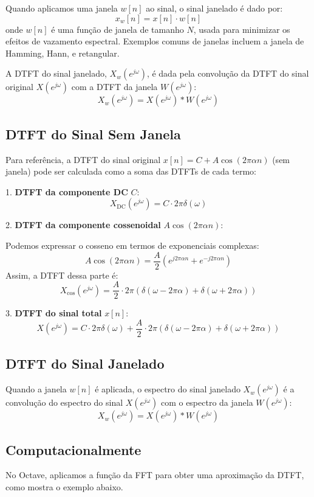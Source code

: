 Quando aplicamos uma janela $w[n]$ ao sinal, o sinal janelado é dado por:
$$
   x_w[n] = x[n] \cdot w[n]
$$
onde $w[n]$ é uma função de janela de tamanho $N$, usada para minimizar os efeitos de vazamento espectral. Exemplos comuns de janelas incluem a janela de Hamming, Hann, e retangular.

A DTFT do sinal janelado, $X_w(e^{j \omega})$, é dada pela convolução da DTFT do sinal original $X(e^{j \omega})$ com a DTFT da janela $W(e^{j \omega})$:
$$
   X_w(e^{j \omega}) = X(e^{j \omega}) * W(e^{j \omega})
$$

\subsection*{DTFT do Sinal Sem Janela}

Para referência, a DTFT do sinal original $x[n] = C + A \cos(2 \pi \alpha n)$ (sem janela) pode ser calculada como a soma das DTFTs de cada termo:

1. \textbf{DTFT da componente DC} $C$:
$$
   X_{\text{DC}}(e^{j \omega}) = C \cdot 2 \pi \delta(\omega)
$$

2. \textbf{DTFT da componente cossenoidal} $A \cos(2 \pi \alpha n)$:

Podemos expressar o cosseno em termos de exponenciais complexas:
$$
   A \cos(2 \pi \alpha n) = \frac{A}{2} \left( e^{j 2 \pi \alpha n} + e^{-j 2 \pi \alpha n} \right)
$$
Assim, a DTFT dessa parte é:
$$
   X_{\cos}(e^{j \omega}) = \frac{A}{2} \cdot 2 \pi \left( \delta(\omega - 2 \pi \alpha) + \delta(\omega + 2 \pi \alpha) \right)
$$

3. \textbf{DTFT do sinal total} $x[n]$:
$$
   X(e^{j \omega}) = C \cdot 2 \pi \delta(\omega) + \frac{A}{2} \cdot 2 \pi \left( \delta(\omega - 2 \pi \alpha) + \delta(\omega + 2 \pi \alpha) \right)
$$

\subsection*{DTFT do Sinal Janelado}

Quando a janela $w[n]$ é aplicada, o espectro do sinal janelado $X_w(e^{j \omega})$ é a convolução do espectro do sinal $X(e^{j \omega})$ com o espectro da janela $W(e^{j \omega})$:
$$
   X_w(e^{j \omega}) = X(e^{j \omega}) * W(e^{j \omega})
$$

\subsection*{Computacionalmente}
No Octave, aplicamos a função da FFT para obter uma aproximação da DTFT, como mostra o exemplo abaixo.

